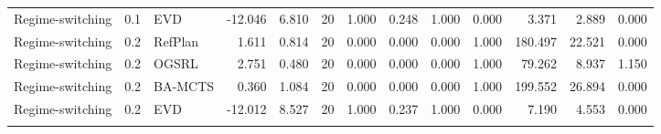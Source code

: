 \documentclass[10pt]{article}
\begin{document}
\begin{landscape}
\begin{center}
\begin{longtable}{@{}lllr@{}r@{}r@{}rrrrrrr@{}}
Regime-switching & 0.1 & EVD & -12.046 & 6.810 & 20 & 1.000 & 0.248 & 1.000 & 0.000 & 3.371 & 2.889 & 0.000 \\
\addlinespace[1.5pt]
Regime-switching & 0.2 & RefPlan & 1.611 & 0.814 & 20 & 0.000 & 0.000 & 0.000 & 1.000 & 180.497 & 22.521 & 0.000 \\
Regime-switching & 0.2 & OGSRL & 2.751 & 0.480 & 20 & 0.000 & 0.000 & 0.000 & 1.000 & 79.262 & 8.937 & 1.150 \\
Regime-switching & 0.2 & BA-MCTS & 0.360 & 1.084 & 20 & 0.000 & 0.000 & 0.000 & 1.000 & 199.552 & 26.894 & 0.000 \\
Regime-switching & 0.2 & EVD & -12.012 & 8.527 & 20 & 1.000 & 0.237 & 1.000 & 0.000 & 7.190 & 4.553 & 0.000 \\
\addlinespace[1.5pt]
\end{longtable}
\end{center}
\end{landscape}
\end{document}
